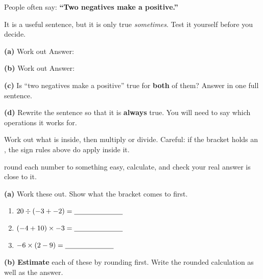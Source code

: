 \documentclass[12pt,a4paper]{article}
\begin{document}
\begin{yourturn}
  People often say: \textbf{``Two negatives make a positive.''}

  \medskip
  It is a useful sentence, but it is only true \emph{sometimes}. Test it yourself
  before you decide.
\end{yourturn}

\noindent\textbf{(a)} Work out \quad {} \quad Answer: \blank[2.4cm]

\vspace{8pt}
\noindent\textbf{(b)} Work out \quad {} \quad Answer: \blank[2.4cm]

\vspace{10pt}
\noindent\textbf{(c)} Is ``two negatives make a positive'' true for \textbf{both} of
them? Answer in one full sentence.

\vspace{6pt}
\noindent\textbf{(d)} Rewrite the sentence so that it is \textbf{always} true. You will
need to say which operations it works for.


\begin{remember}
   Work out what is inside, then multiply or divide.
  Careful: if the bracket holds an , the sign rules above do
   apply inside it.

  \medskip
   round each number to something easy, calculate, and check your real
  answer is close to it.
\end{remember}

\noindent\textbf{(a)} Work these out. Show what the bracket comes to first.

\vspace{6pt}
\begin{enumerate}[label=(\roman*), itemsep=11pt]
  \item $20 \div (-3 + -2) = \blank[2.4cm]$
  \item $(-4 + 10) \times -3 = \blank[2.4cm]$
  \item $-6 \times (2 - 9) = \blank[2.4cm]$
\end{enumerate}

\vspace{8pt}
\noindent\textbf{(b)} \textbf{Estimate} each of these by rounding first. Write the
rounded calculation as well as the answer.
\end{document}
